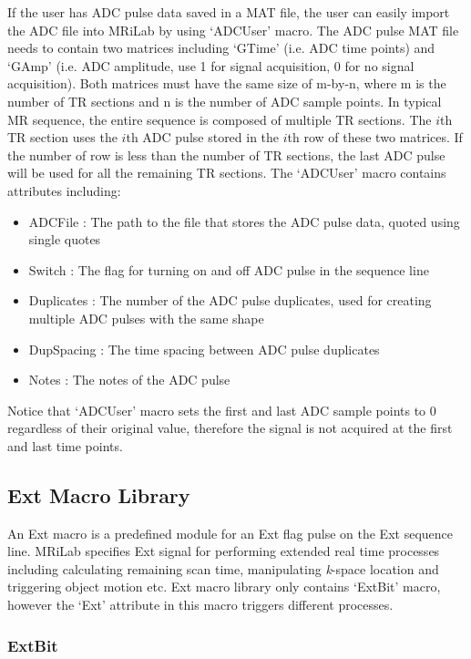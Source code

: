 \documentclass{book}%
\begin{document}
If the user has ADC pulse data saved in a MAT file, the user can easily import the ADC file into MRiLab by using `ADCUser' macro. The ADC pulse MAT file needs to contain two matrices including `GTime' (i.e. ADC time points) and `GAmp' (i.e. ADC amplitude, use 1 for signal acquisition, 0 for no signal acquisition). Both matrices must have the same size of m-by-n, where m is the number of TR sections and n is the number of ADC sample points. In typical MR sequence, the entire sequence is composed of multiple TR sections. The $i$th TR section uses the $i$th ADC pulse stored in the $i$th row of these two matrices. If the number of row is less than the number of TR sections, the last ADC pulse will be used for all the remaining TR sections. The `ADCUser' macro contains attributes including:

\begin{itemize}
	\item ADCFile : The path to the file that stores the ADC pulse data, quoted using single quotes
	\item Switch : The flag for turning on and off ADC pulse in the sequence line
	\item Duplicates : The number of the ADC pulse duplicates, used for creating multiple ADC pulses with the same shape
	\item DupSpacing : The time spacing between ADC pulse duplicates
	\item Notes : The notes of the ADC pulse 
\end{itemize}

Notice that `ADCUser' macro sets the first and last ADC sample points to 0 regardless of their original value, therefore the signal is not acquired at the first and last time points.

\subsection{Ext Macro Library} \label{subs:ExtMacroLibrary}

An Ext macro is a predefined module for an Ext flag pulse on the Ext sequence line. MRiLab specifies Ext signal for performing extended real time processes including calculating remaining scan time, manipulating \textit{k}-space location and triggering object motion etc. Ext macro library only contains `ExtBit' macro, however the `Ext' attribute in this macro triggers different processes. 

\subsubsection{ExtBit}
\end{document}
